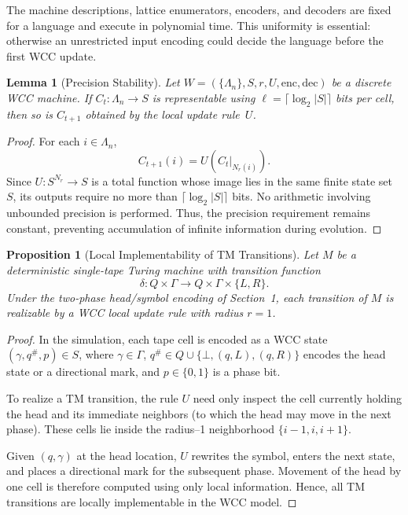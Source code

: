\documentclass[12pt]{article}
\newtheorem{lemma}[theorem]{Lemma}
\newtheorem{proposition}[theorem]{Proposition}
\begin{document}
The machine descriptions, lattice enumerators, encoders, and decoders are
fixed for a language and execute in polynomial time. This uniformity is
essential: otherwise an unrestricted input encoding could decide the language
before the first WCC update.


\begin{lemma}[Precision Stability]
\label{lem:precision-stability}
Let
$W = (\{\Lambda_n\}, S, r, U, \mathrm{enc}, \mathrm{dec})$
be a discrete WCC machine.
If $C_t : \Lambda_n \to S$ is representable using
$\ell = \lceil\log_2 |S|\rceil$ bits per cell, then so is $C_{t+1}$ obtained by the
local update rule~$U$.
\end{lemma}

\begin{proof}
For each $i \in \Lambda_n$,
\[
   C_{t+1}(i) = U(C_t|_{N_r(i)}).
\]
Since $U : S^{N_r} \to S$ is a total function whose image lies in the
same finite state set $S$, its outputs require no more than
$\lceil\log_2|S|\rceil$ bits.
No arithmetic involving unbounded precision is performed.
Thus, the precision requirement remains constant, preventing
accumulation of infinite information during evolution.
\end{proof}


\begin{proposition}[Local Implementability of TM Transitions]
\label{prop:local-tm}
Let $M$ be a deterministic single-tape Turing machine with transition
function
\[
   \delta : Q \times \Gamma \to Q \times \Gamma \times \{L, R\}.
\]
Under the two-phase head/symbol encoding of Section~1, each transition
of $M$ is realizable by a WCC local update rule with radius $r = 1$.
\end{proposition}

\begin{proof}
In the simulation, each tape cell is encoded as a WCC state
$(\gamma, q^\#, p) \in S$, where $\gamma \in \Gamma$,
$q^\# \in Q \cup \{\bot, (q,L), (q,R)\}$ encodes the head state or a
directional mark, and $p \in \{0,1\}$ is a phase bit.

To realize a TM transition, the rule $U$ need only inspect the cell
currently holding the head and its immediate neighbors (to which the
head may move in the next phase).  These cells lie inside the radius--1
neighborhood $\{i-1, i, i+1\}$.

Given $(q, \gamma)$ at the head location, $U$ rewrites the symbol,
enters the next state, and places a directional mark for the subsequent
phase.  Movement of the head by one cell is therefore computed using
only local information. Hence, all TM transitions are locally
implementable in the WCC model.
\end{proof}
\end{document}
